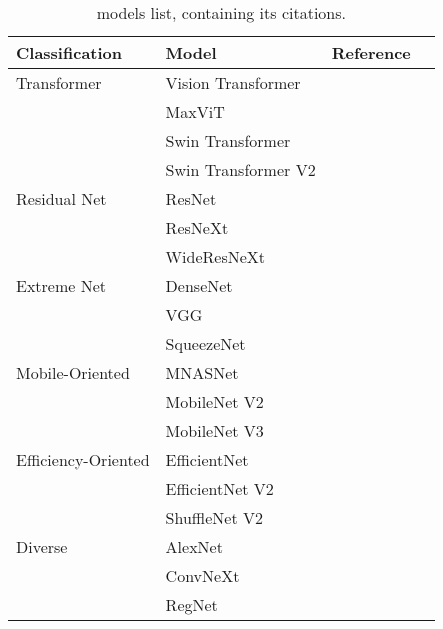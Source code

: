 
\begin{table}
	\centering
	\caption{ models list, containing its citations.}
	\begin{tabular}{llcc}
		\toprule	
		Classification 		& Model 		& Reference 			\\
 		\midrule	
		Transformer    		& Vision Transformer	& \cite{VisionTransformer}	\\
			   		& MaxViT		& \cite{MaxViT}			\\
			   		& Swin Transformer	& \cite{SwinTransformer}	\\
			   		& Swin Transformer V2	& \cite{SwinTransformerV2}	\\
		Residual Net   		& ResNet		& \cite{ResNet}			\\
			 		& ResNeXt		& \cite{ResNeXt}		\\
			 		& WideResNeXt		& \cite{WideResNet}		\\
		Extreme Net	   	& DenseNet		& \cite{DenseNet}		\\
				 	& VGG			& \cite{VGG}			\\
					& SqueezeNet		& \cite{SqueezeNet}		\\
		Mobile-Oriented		& MNASNet		& \cite{MNASNet}		\\
					& MobileNet V2		& \cite{MobileNetV2}		\\
					& MobileNet V3		& \cite{MobileNetV3}		\\
		Efficiency-Oriented	& EfficientNet		& \cite{EfficientNet}		\\
					& EfficientNet V2	& \cite{EfficientNetV2}		\\
					& ShuffleNet V2		& \cite{ShuffleNetV2}		\\
		Diverse		  	& AlexNet		& \cite{AlexNet}		\\
					& ConvNeXt		& \cite{ConvNeXt}		\\
 					& RegNet		& \cite{RegNet}			\\
		\bottomrule
	\end{tabular}
	\label{tab:cv_list}
\end{table}
